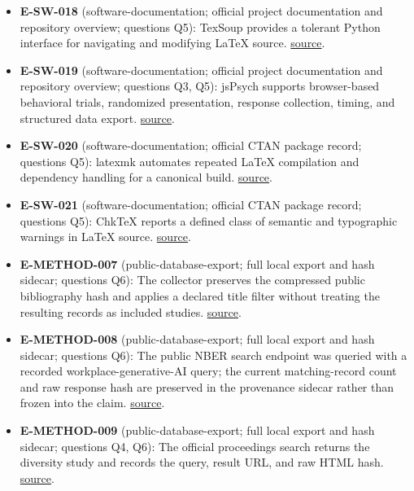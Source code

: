 \documentclass[11pt]{article}
\begin{document}
\begin{itemize}
  \textbf{E-SW-017} (software-documentation; official project documentation and repository overview; questions Q5, Q6): unified-latex supplies JavaScript and TypeScript parsing and transformation utilities for LaTeX in the unified ecosystem. \href{https://siefkenj.github.io/unified-latex/index.html}{source}.
\item
  \textbf{E-SW-018} (software-documentation; official project documentation and repository overview; questions Q5): TexSoup provides a tolerant Python interface for navigating and modifying LaTeX source. \href{https://texsoup.alvinwan.com/}{source}.
\item
  \textbf{E-SW-019} (software-documentation; official project documentation and repository overview; questions Q3, Q5): jsPsych supports browser-based behavioral trials, randomized presentation, response collection, timing, and structured data export. \href{https://www.jspsych.org/v7/}{source}.
\item
  \textbf{E-SW-020} (software-documentation; official CTAN package record; questions Q5): latexmk automates repeated LaTeX compilation and dependency handling for a canonical build. \href{https://ctan.org/pkg/latexmk}{source}.
\item
  \textbf{E-SW-021} (software-documentation; official CTAN package record; questions Q5): ChkTeX reports a defined class of semantic and typographic warnings in LaTeX source. \href{https://ctan.org/pkg/chktex}{source}.
\item
  \textbf{E-METHOD-007} (public-database-export; full local export and hash sidecar; questions Q6): The collector preserves the compressed public bibliography hash and applies a declared title filter without treating the resulting records as included studies. \href{https://aclanthology.org/anthology.bib.gz}{source}.
\item
  \textbf{E-METHOD-008} (public-database-export; full local export and hash sidecar; questions Q6): The public NBER search endpoint was queried with a recorded workplace-generative-AI query; the current matching-record count and raw response hash are preserved in the provenance sidecar rather than frozen into the claim. \href{https://www.nber.org/api/v1/search}{source}.
\item
  \textbf{E-METHOD-009} (public-database-export; full local export and hash sidecar; questions Q4, Q6): The official proceedings search returns the diversity study and records the query, result URL, and raw HTML hash. \href{https://proceedings.iclr.cc/papers/search?q=writing+language+models}{source}.
\end{itemize}
\end{document}
